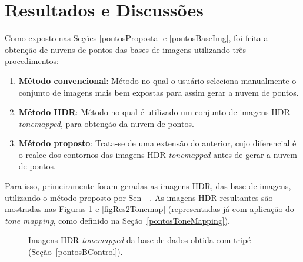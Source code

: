 \section{Resultados e Discussões} \label{pontosResultados}

Como exposto nas Seções \ref{pontosProposta} e \ref{pontosBaseImg}, foi feita a obtenção de nuvens de pontos das bases de imagens utilizando três procedimentos:

\begin{enumerate}
\item \textbf{Método convencional}: Método no qual o usuário seleciona manualmente o conjunto de imagens mais bem expostas para assim gerar a nuvem de pontos.

\item \textbf{Método HDR}: Método no qual é utilizado um conjunto de imagens HDR \textit{tonemapped}, para obtenção da nuvem de pontos.

\item \textbf{Método proposto}: Trata-se de uma extensão do anterior, cujo diferencial é o realce dos contornos das imagens HDR \textit{tonemapped} antes de gerar a nuvem de pontos.
\end{enumerate}

Para isso, primeiramente foram geradas as imagens HDR, das base de imagens, utilizando o método proposto por Sen~\etal~\cite{hdrMovimento}. As imagens HDR resultantes são mostradas nas Figuras \ref{figResTonemap} e \ref{figRes2Tonemap} (representadas já com aplicação do \textit{tone mapping}, como definido na Seção~\ref{pontosToneMapping}). 


\begin{figure}[H]
  \centering 
  \quad %
  \quad %
  \quad %
  \caption{Imagens HDR \textit{tonemapped} da base de dados obtida com tripé (Seção~\protect\ref{pontosBControl}).}
  \label{figResTonemap}
\end{figure}

